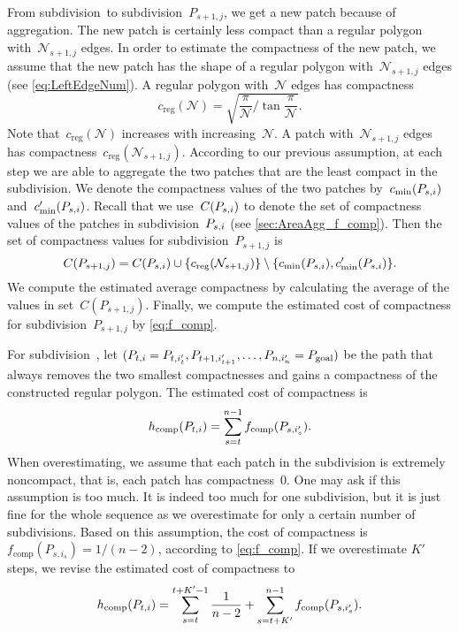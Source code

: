 \documentclass[acmsmall,natbib=false]{acmart}
\begin{document}
From subdivision~\Psnode to subdivision~$P_{s+1,j}$,
we get a new patch because of aggregation.
The new patch is certainly less compact than a regular polygon 
with~$\mathcal{N}_{s+1,j}$ edges.
In order to estimate the compactness of the new patch, 
we assume that 
the new patch has the shape of a regular polygon 
with~$\mathcal{N}_{s+1,j}$ edges 
(see \eq\ref{eq:LeftEdgeNum}).
A regular polygon with~$\mathcal{N}$ edges has compactness
\begin{equation*}
\label{eq:comp_regular}
c_\mathrm{reg}(\mathcal{N})=
\sqrt{\frac{\pi}{\mathcal{N}} \bigg/
	\tan{\frac{\pi}{\mathcal{N}}}}.
\end{equation*}
Note that~$c_\mathrm{reg}(\mathcal{N})$ increases 
with increasing~$\mathcal{N}$.
A patch with~$\mathcal{N}_{s+1,j}$ edges has
compactness~$c_\mathrm{reg} (\mathcal{N}_{s+1,j})$.
According to our previous assumption, 
at each step we are able to aggregate the two patches 
that are the least compact in the subdivision.
We denote the compactness values of the two patches
by~$c_\mathrm{min}(P_{s,i})$ and~$c'_\mathrm{min}(P_{s,i})$.
Recall that we use~$C(P_{s,i})$ to denote 
the set of compactness values of the patches
in subdivision~$P_{s,i}$ 
(see \sect\ref{sec:AreaAgg_f_comp}).
Then the set of compactness values 
for subdivision~$P_{s+1,j}$ is 
\begin{equation}
\label{eq:compsetnew}
C(P_{s+1,j})=
C(P_{s,i})\cup 
\{c_\mathrm{reg} (\mathcal{N}_{s+1,j})\}
\setminus \{c_\mathrm{min}(P_{s,i}), c'_\mathrm{min}(P_{s,i})\}.
\nonumber
\end{equation}
We compute the estimated average compactness 
by calculating the average 
of the values in set~$C(P_{s+1,j})$.
Finally, we compute the estimated cost of compactness for subdivision~$P_{s+1,j}$ by \eq\ref{eq:f_comp}.

For subdivision~\Pnode, let
$(P_{t,i}=P_{t,i'_t}, P_{t+1,i'_{t+1}}, 
\dots,P_{n,i'_n}=P_\mathrm{goal})$
be the path that always removes the two smallest compactnesses
and gains a compactness of the constructed regular polygon.
The estimated cost of compactness is
\begin{equation}
\label{eq:h_comp}
h_\mathrm{comp}(P_{t,i})=
\sum_{s=t}^{n-1}f_\mathrm{comp}(P_{s,i'_s}). \nonumber
\end{equation}
When overestimating, we assume that 
each patch in the subdivision is extremely noncompact,
that is, each patch has compactness~$0$.
One may ask if this assumption is too much.
It is indeed too much for one subdivision, 
but it is just fine for the whole sequence
as we overestimate for only a certain number of subdivisions.
Based on this assumption,
the cost of compactness is $f_\mathrm{comp}(P_{s,i_s})=1/(n-2)$,
according to \eq\ref{eq:f_comp}.
If we overestimate $K'$ steps, 
we revise the estimated cost of compactness to
\begin{equation}
\label{eq:o_comp}
h_\mathrm{comp}(P_{t,i})=
\sum_{s=t}^{t+K'-1}\frac{1}{n-2}+
\sum_{s=t+K'}^{n-1}f_\mathrm{comp}(P_{s,i'_s}).
\end{equation}
\end{document}
